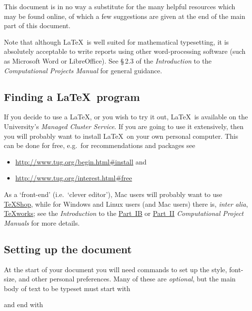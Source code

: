 
This document is in no way a substitute for the many helpful resources
which may be found online, of which a few suggestions are given at the
end of the main part of this document.

Note that although \LaTeX\ is well suited for mathematical
typesetting, it is absolutely acceptable to write reports using other
word-processing software (such as Microsoft Word or LibreOffice).
%
%
See \S\,2.3 of the \textsl{Introduction} to the \textsl{Computational
  Projects Manual} for general guidance.

\subsection{Finding a \LaTeX\ program}

If you decide to use a \LaTeX, or you wish to try it out, \LaTeX\ is
available on the University's \textsl{Managed Cluster Service}. If you
are going to use it extensively, then you will probably want to
install \LaTeX\ on your own personal computer. This can be done for
free, e.g.\ for recommendations and packages see
\begin{itemize}
\item \url{http://www.tug.org/begin.html\#install} and
\item \url{http://www.tug.org/interest.html\#free}
\end{itemize}
As a `front-end' (i.e.\ `clever editor'), Mac users will probably want
to use \href{http://pages.uoregon.edu/koch/texshop/}{{\TeX}Shop},
while for Windows and Linux users (and Mac users) there is,
\textit{inter alia}, \href{http://www.tug.org/texworks/}{{\TeX}works};
see the \textsl{Introduction} to the
\href{http://www.maths.cam.ac.uk/undergrad/catam/IB/}{Part~IB} or
\href{http://www.maths.cam.ac.uk/undergrad/catam/II/}{Part~II}
\textsl{Computational Project Manuals} for more details.

\subsection{Setting up the document}\label{setup}

At the start of your document you will need commands to set up the
style, font-size, and other personal preferences.  Many of these are
\textit{optional}, but the main body of text to be typeset must start
with
\begin{quote}
\verb||
\end{quote}
and end with
\begin{quote}
\verb||
\end{quote}

